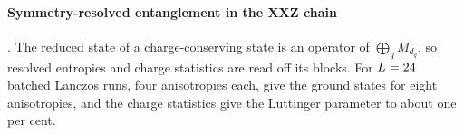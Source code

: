 \paragraph{Symmetry-resolved entanglement in the XXZ chain}\label{sec:sre} \cite{nn_btc}. The reduced state of a
charge-conserving state is an operator of $\bigoplus_qM_{d_q}$, so resolved entropies and charge statistics are read off
its blocks. For $L=\IfFileExists{generated/symmetry_resolved.tex}{\SRL}{24}$ batched Lanczos runs, four anisotropies each, give
the ground states for eight anisotropies, and the charge statistics give the Luttinger parameter to about one per cent.
